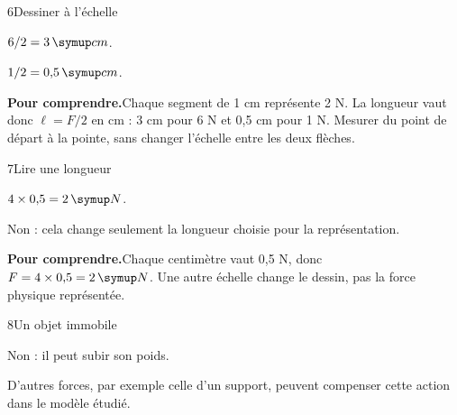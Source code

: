 \par\noindent\begin{minipage}{\linewidth}
\begin{corrige}{6}{Dessiner à l’échelle}
\begin{questions}
\item $6/2=3\unite{cm}$.
\item $1/2=0{,}5\unite{cm}$.
\end{questions}
\par\smallskip\noindent\textbf{Pour comprendre.}\enspace Chaque segment de 1 cm représente 2 N. La longueur vaut donc $\ell=F/2$ en cm : 3 cm pour 6 N et 0,5 cm pour 1 N. Mesurer du point de départ à la pointe, sans changer l’échelle entre les deux flèches.\par
{}
\end{corrige}
\end{minipage}
\par\noindent\begin{minipage}{\linewidth}
\begin{corrige}{7}{Lire une longueur}
\begin{questions}
\item $4\times0{,}5=2\unite N$.
\item Non : cela change seulement la longueur choisie pour la représentation.
\end{questions}
\par\smallskip\noindent\textbf{Pour comprendre.}\enspace Chaque centimètre vaut 0,5 N, donc $F=4\times0{,}5=2\unite N$. Une autre échelle change le dessin, pas la force physique représentée.\par
{}
\end{corrige}
\end{minipage}
\par\noindent\begin{minipage}{\linewidth}
\begin{corrige}{8}{Un objet immobile}
\begin{questions}
\item Non : il peut subir son poids.
\item D’autres forces, par exemple celle d’un support, peuvent compenser cette action dans le modèle étudié.
\end{questions}
\end{corrige}
\end{minipage}
